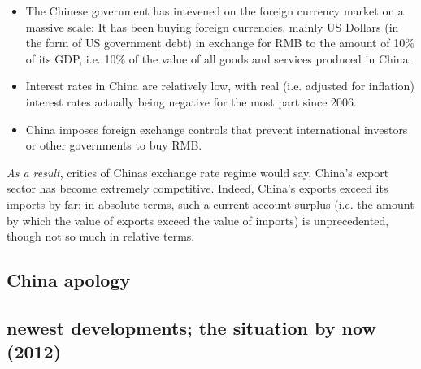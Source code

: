 \documentclass[11pt]{article}
\begin{document}
\begin{itemize}
\item{The Chinese government has intevened on the foreign currency market on a massive scale: It has been buying foreign currencies, mainly US Dollars (in the form of US government debt) in exchange for RMB to the amount of 10\% of its GDP, i.e. 10\% of the value of all goods and services produced in China.} %
\item{Interest rates in China are relatively low, with real (i.e. adjusted for inflation) interest rates actually being negative for the most part since 2006.} %
\item{China imposes foreign exchange controls that prevent international investors or other governments to buy RMB.}%
\end{itemize}

\emph{As a result}, critics of Chinas exchange rate regime would say, China's export sector has become extremely competitive. Indeed, China's exports exceed its imports by far; in absolute terms, such a current account surplus (i.e. the amount by which the value of exports exceed the value of imports) is unprecedented, though not so much in relative terms. %

 

\subsection{China apology}


\subsection{newest developments; the situation by now (2012)}
\end{document}
